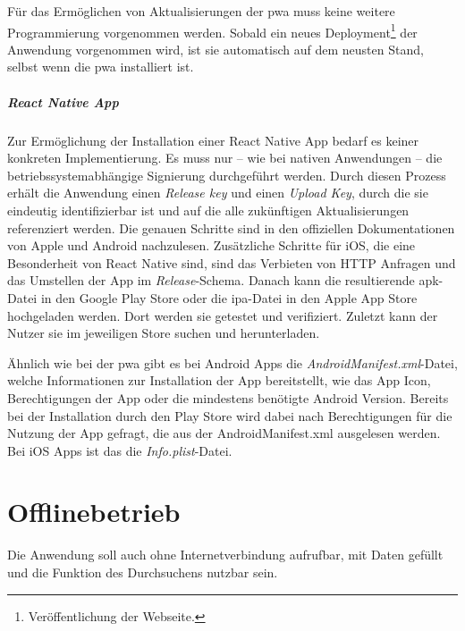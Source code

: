 Für das Ermöglichen von Aktualisierungen der \ac{pwa} muss keine weitere Programmierung vorgenommen werden.
Sobald ein neues Deployment\footnote{Veröffentlichung der Webseite.} der Anwendung vorgenommen wird, ist sie automatisch auf dem neusten Stand, selbst wenn die \ac{pwa} installiert ist.

\subparagraph{React Native App\\}
Zur Ermöglichung der Installation einer React Native App bedarf es keiner konkreten Implementierung.
Es muss nur  -- wie bei nativen Anwendungen -- die betriebssystemabhängige Signierung durchgeführt werden.
Durch diesen Prozess erhält die Anwendung einen \textit{Release key} und einen \textit{Upload Key}, durch die sie eindeutig identifizierbar ist und auf die alle zukünftigen Aktualisierungen referenziert werden.
Die genauen Schritte sind in den offiziellen Dokumentationen von Apple und Android nachzulesen.
Zusätzliche Schritte für iOS, die eine Besonderheit von React Native sind, sind das Verbieten von HTTP Anfragen und das Umstellen der App im \textit{Release}-Schema.
Danach kann die resultierende \ac{apk}-Datei in den Google Play Store oder die \ac{ipa}-Datei in den Apple App Store hochgeladen werden.
Dort werden sie getestet und verifiziert.
Zuletzt kann der Nutzer sie im jeweiligen Store suchen und herunterladen.

Ähnlich wie bei der \ac{pwa} gibt es bei Android Apps die \textit{AndroidManifest.xml}-Datei, welche Informationen zur Installation der App bereitstellt, wie das App Icon, Berechtigungen der App oder die mindestens benötigte Android Version.
Bereits bei der Installation durch den Play Store wird dabei nach Berechtigungen für die Nutzung der App gefragt, die aus der AndroidManifest.xml ausgelesen werden.
Bei iOS Apps ist das die \textit{Info.plist}-Datei.

\section{Offlinebetrieb}
Die Anwendung soll auch ohne Internetverbindung aufrufbar, mit Daten gefüllt und die Funktion des Durchsuchens nutzbar sein.

